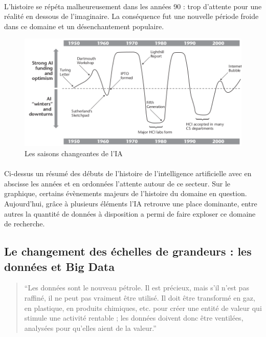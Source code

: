 \documentclass[10pt, french, a4paper]{report}
\begin{document}
\paragraph{}
L’histoire se répéta malheureusement dans les années 90 : trop d’attente pour une réalité en dessous de l’imaginaire. La conséquence fut une nouvelle période froide dans ce domaine et un désenchantement populaire.

\begin{center}
  \begin{figure}[hbt!]
      \includegraphics[width=\textwidth]{images/grudin_2009_changing_seasons_ai.png}
      \caption{Les saisons changeantes de l'IA \citep{grudin_ai_2009}}
  \end{figure}
\end{center}

\paragraph{}
Ci-dessus un résumé des débuts de l’histoire de l’intelligence artificielle avec en abscisse les années et en ordonnées l’attente autour de ce secteur. Sur le graphique, certains évènements majeurs de l’histoire du domaine en question. Aujourd'hui, grâce à plusieurs éléments l'IA retrouve une place dominante, entre autres la quantité de données à disposition a permi de faire exploser ce domaine de recherche. 

\subsection{Le changement des échelles de grandeurs : les données et Big Data}

\begin{quotation}
  ``Les données sont le nouveau pétrole. Il est précieux, mais s'il n'est pas raffiné, il ne peut pas vraiment être utilisé. Il doit être transformé en gaz, en plastique, en produits chimiques, etc. pour créer une entité de valeur qui stimule une activité rentable ; les données doivent donc être ventilées, analysées pour qu'elles aient de la valeur.''
\end{quotation}
\end{document}
